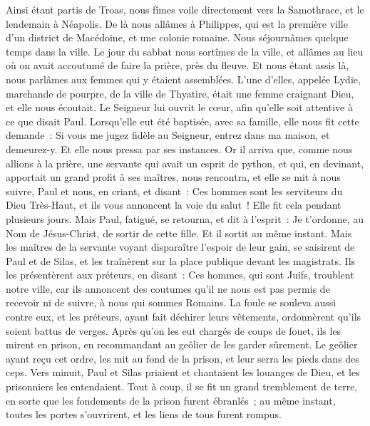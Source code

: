 \begin{multicols}{2}
Ainsi étant partis de Troas, nous fîmes voile directement vers la Samothrace, et le lendemain à Néapolis.
De là nous allâmes à Philippes, qui est la première ville d'un district de Macédoine, et une colonie romaine. Nous séjournâmes quelque temps dans la ville.
Le jour du sabbat nous sortîmes de la ville, et allâmes au lieu où on avait accoutumé de faire la prière, près du fleuve. Et nous étant assis là, nous parlâmes aux femmes qui y étaient assemblées.
L'une d'elles, appelée Lydie, marchande de pourpre, de la ville de Thyatire, était une femme craignant Dieu, et elle nous écoutait. Le Seigneur lui ouvrit le cœur, afin qu'elle soit attentive à ce que disait Paul.
Lorsqu'elle eut été baptisée, avec sa famille, elle nous fit cette demande~: Si vous me jugez fidèle au Seigneur, entrez dans ma maison, et demeurez-y. Et elle nous pressa par ses instances.
Or il arriva que, comme nous allions à la prière, une servante qui avait un esprit de python, et qui, en devinant, apportait un grand profit à ses maîtres, nous rencontra,
et elle se mit à nous suivre, Paul et nous, en criant, et disant~: Ces hommes sont les serviteurs du Dieu Très-Haut, et ils vous annoncent la voie du salut~!
Elle fit cela pendant plusieurs jours. Mais Paul, fatigué, se retourna, et dit à l'esprit~: Je t'ordonne, au Nom de Jésus-Christ, de sortir de cette fille. Et il sortit au même instant.
Mais les maîtres de la servante voyant disparaître l'espoir de leur gain, se saisirent de Paul et de Silas, et les traînèrent sur la place publique devant les magistrats.
Ils les présentèrent aux préteurs, en disant~: Ces hommes, qui sont Juifs, troublent notre ville,
car ils annoncent des coutumes qu'il ne nous est pas permis de recevoir ni de suivre, à nous qui sommes Romains.
La foule se souleva aussi contre eux, et les préteurs, ayant fait déchirer leurs vêtements, ordonnèrent qu'ils soient battus de verges.
Après qu'on les eut chargés de coups de fouet, ils les mirent en prison, en recommandant au geôlier de les garder sûrement.
Le geôlier ayant reçu cet ordre, les mit au fond de la prison, et leur serra les pieds dans des ceps.
Vers minuit, Paul et Silas priaient et chantaient les louanges de Dieu, et les prisonniers les entendaient.
Tout à coup, il se fit un grand tremblement de terre, en sorte que les fondements de la prison furent ébranlés~; au même instant, toutes les portes s'ouvrirent, et les liens de tous furent rompus.

\end{multicols}
